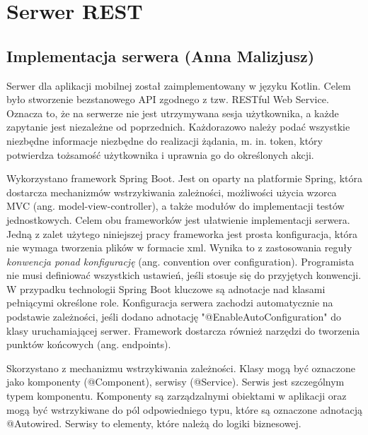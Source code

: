 \documentclass[10pt,twoside,a4paper]{report}
\begin{document}
\chapter{Serwer REST}
\section{Implementacja serwera (Anna Malizjusz)}
\par Serwer dla aplikacji mobilnej został zaimplementowany w języku Kotlin. Celem było stworzenie bezstanowego API zgodnego z tzw. RESTful Web Service. Oznacza to, że na serwerze nie jest utrzymywana sesja użytkownika, a każde zapytanie jest niezależne od poprzednich. Każdorazowo należy podać wszystkie niezbędne informacje niezbędne do realizacji żądania, m. in. token, który potwierdza tożsamość użytkownika i uprawnia go do określonych akcji.
\par Wykorzystano framework Spring Boot\cite{Spring documentation}. Jest on oparty na platformie Spring, która dostarcza mechanizmów wstrzykiwania zależności, możliwości użycia wzorca MVC (ang. model-view-controller), a także modułów do implementacji testów jednostkowych. Celem obu frameworków jest ułatwienie implementacji serwera. Jedną z zalet użytego niniejszej pracy frameworka jest prosta konfiguracja, która nie wymaga tworzenia plików w formacie xml. Wynika to z zastosowania reguły \textit{konwencja ponad konfigurację} (ang. convention over configuration). Programista nie musi definiować wszystkich ustawień, jeśli stosuje się do przyjętych konwencji. W przypadku technologii Spring Boot kluczowe są adnotacje nad klasami pełniącymi określone role. 
Konfiguracja serwera zachodzi automatycznie na podstawie zależności, jeśli dodano adnotację "@EnableAutoConfiguration" do klasy uruchamiającej serwer. Framework dostarcza również narzędzi do tworzenia punktów końcowych (ang. endpoints).

\par Skorzystano z mechanizmu wstrzykiwania zależności. Klasy mogą być oznaczone jako komponenty (@Component), serwisy (@Service). Serwis jest szczególnym typem komponentu. Komponenty są zarządzalnymi obiektami w aplikacji oraz mogą być wstrzykiwane do pól odpowiedniego typu, które są oznaczone adnotacją @Autowired. Serwisy to elementy, które należą do logiki biznesowej.
 
\end{document}
